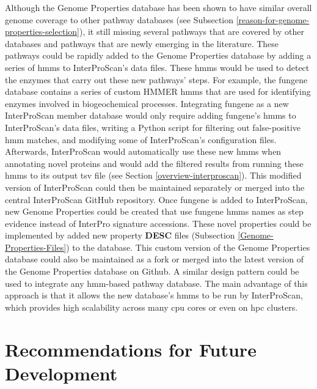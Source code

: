 Although the Genome Properties database has been shown to have similar overall 
genome coverage to other pathway databases (see Subsection 
\ref{reason-for-genome-properties-selection}), it still missing several pathways 
that are covered by other databases and pathways that are newly emerging in the 
literature. These pathways could be rapidly added to the Genome Properties 
database by adding a series of \gls{hmm}s \cite{eddy2011accelerated} to 
InterProScan's data files. These \gls{hmm}s would be used to detect the enzymes 
that carry out these new pathways' steps. For example, the \gls{fungene} 
\cite{fish2013fungene} database contains a series of custom HMMER 
\cite{eddy2011accelerated} \gls{hmm}s that are used for identifying enzymes 
involved in biogeochemical processes. Integrating \gls{fungene} as a new InterProScan 
member database would only require adding \gls{fungene}'s \gls{hmm}s to InterProScan's 
data files, writing a Python script for filtering out false-positive \gls{hmm} 
matches, and modifying some of InterProScan's configuration files. Afterwards, 
InterProScan would automatically use these new \gls{hmm}s when annotating novel 
proteins and would add the filtered results from running these \gls{hmm}s to its 
output \gls{tsv} file (see Section \ref{overview-interproscan}). This modified 
version of InterProScan could then be maintained separately or merged into the 
central InterProScan GitHub repository. Once \gls{fungene} is added to InterProScan, 
new Genome Properties could be created that use \gls{fungene} \gls{hmm}s names as step 
evidence instead of InterPro signature accessions. These novel properties could 
be implemented by added new property \textbf{DESC} files (Subsection 
\ref{Genome-Properties-Files}) to the database. This custom version of the 
Genome Properties database could also be maintained as a fork or merged into the 
latest version of the Genome Properties database on Github. A similar design 
pattern could be used to integrate any \gls{hmm}-based pathway database. The 
main advantage of this approach is that it allows the new database's \gls{hmm}s 
to be run by InterProScan, which provides high scalability across many \gls{cpu} 
cores or even on \gls{hpc} clusters.

\section{Recommendations for Future Development}


